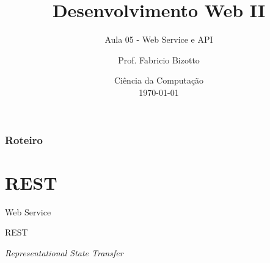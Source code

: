 \documentclass[
	9pt, %
	t, %
]{beamer}
\title[DesWebII]{Desenvolvimento Web II} %
\subtitle{Aula 05 - Web Service e API} %
\author[Fabricio Bizotto]{Prof. Fabricio Bizotto} %
\institute[IFC]{Instituto Federal Catarinense \\ \smallskip \textit{fabricio.bizotto@ifc.edu.br}} %
\date[\today]{Ciência da Computação \\ \today} %
\begin{document}

\begin{frame}
	\titlepage %
\end{frame}


\begin{frame}
	\frametitle{Roteiro} %

	\tableofcontents %
\end{frame}


\section{REST}

\begin{frame}
	\begin{center}

		\bigskip\bigskip\bigskip\bigskip %
		{\Large Web Service}

		\bigskip\bigskip %
		{\Huge REST}

		\smallskip
		{\small \textit{Representational State Transfer}}
	\end{center}

\end{frame}
\end{document}
